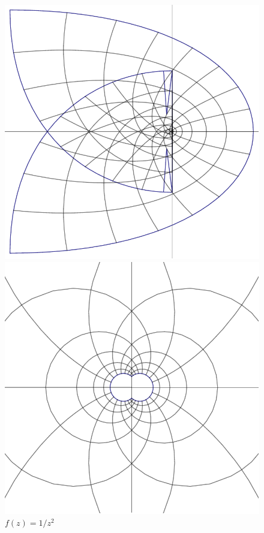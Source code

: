 \begin{example}
\bigskip
\begin{center}
 \begin{figure}[htbp]
 \centering
  \begin{minipage}{.45\textwidth}
  \includegraphics[width=.8\textwidth]{Graphics/conf5.pdf}
  \caption*{$f(z)=z^3$}
  \end{minipage}
  \begin{minipage}{.45\textwidth}
  \includegraphics[width=.8\textwidth]{Graphics/conf2.pdf}
  \caption*{$f(z)=1/z^2$}
  \end{minipage}
  

\end{figure}
\end{center}
\end{example}
